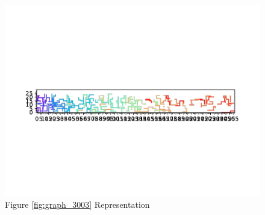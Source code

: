 \documentclass{standalone}
\begin{document}
\begin{figure}[!htb]
	\caption{Figure \ref{fig:graph_3003} Representation}
	\label{fig:picture_3003}
	\includegraphics[width=\textwidth]{../graphs/picture/3003.pdf}
\end{figure}
\end{document}
